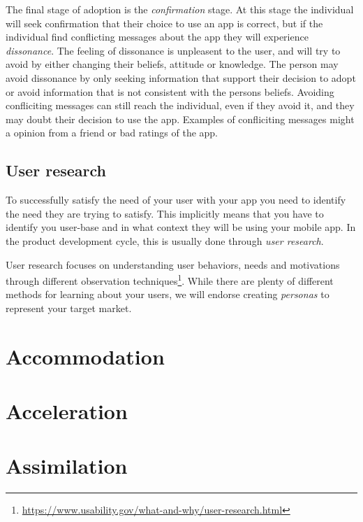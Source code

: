 The final stage of adoption is the \textit{confirmation} stage. At this stage the individual will seek confirmation that their choice to use an app is correct, but if the individual find conflicting messages about the app they will experience \textit{dissonance}. The feeling of dissonance is unpleasent to the user, and will try to avoid by either changing their beliefs, attitude or knowledge. The person may avoid dissonance by only seeking information that support their decision to adopt or avoid information that is not consistent with the persons beliefs. Avoiding confliciting messages can still reach the individual, even if they avoid it, and they may doubt their decision to use the app. Examples of confliciting messages might a opinion from a friend or bad ratings of the app.

\subsection{User research}
To successfully satisfy the need of your user with your app you need to identify the need they are trying to satisfy. This implicitly means that you have to identify you user-base and in what context they will be using your mobile app. In the product development cycle, this is usually done through \textit{user research}.

User research focuses on understanding user behaviors, needs and motivations through different observation techniques\footnote{\url{https://www.usability.gov/what-and-why/user-research.html}}. While there are plenty of different methods for learning about your users, we will endorse creating \textit{personas} to represent your target market.

\section{Accommodation}

\section{Acceleration}

\section{Assimilation}
